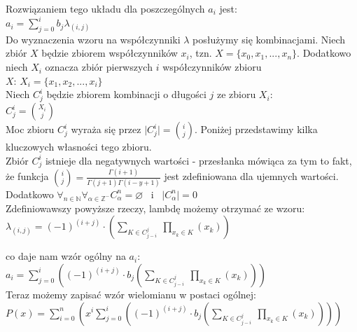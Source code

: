 \documentclass[a4paper,12pt]{article}
\newcommand{\id}{\noindent}
\newcommand{\el}[2]{\lambda_{(#1, #2)}}
\newcommand{\fa}[1]{\displaystyle\mathop{\forall}_{#1}}
\begin{document}
\id
Rozwiązaniem tego układu dla poszczególnych $a_i$ jest: \\

$a_i = \sum\limits_{j=0}^{i}b_j\el{i}{j}$ \\

\id
Do wyznaczenia wzoru na współczynniki $\lambda$ posłużymy się kombinacjami. Niech zbiór $X$ będzie zbiorem współczynników $x_i$, tzn. $X = \{ x_0, x_1, ... , x_n\}$. Dodatkowo niech $X_i$ oznacza zbiór pierwszych $i$ współczynników zbioru \\ $X$: $X_i = \{x_1, x_2, ..., x_i \}$ \\

\id
Niech $C_j^i$ będzie zbiorem kombinacji o długości $j$ ze zbioru $X_i$: \\

$C_j^i = \binom{X_i}{j}$ \\

\id
Moc zbioru $C_j^i$ wyraża się przez $\vert C_j^i\vert = \binom{i}{j}$. Poniżej przedstawimy kilka kluczowych własności tego zbioru. \\

\id
Zbiór $C_j^i$ istnieje dla negatywnych wartości - przesłanka mówiąca za tym to fakt, że funkcja $\binom{i}{j} = \frac{\Gamma (i+1)}{\Gamma (j+1) \Gamma (i-y+1 )}$ jest zdefiniowana dla ujemnych wartości. \\

\id
Dodatkowo $\fa{ n\in \mathbb{N}}\fa{\alpha \in \mathbb{Z}^{-}}C^n_\alpha = \varnothing$ \ i \ $\vert C_\alpha^n\vert = 0$ \\

\id
Zdefiniowawszy powyższe rzeczy, lambdę możemy otrzymać ze wzoru: \\

$\el{i}{j} = (-1)^{(i+j)}\cdot \left( \sum\limits_{K \in C^j_{j-i}} \ \prod\limits_{x_k \in K} \left( x_k \right) \right)$ \\

\newpage

\id
co daje nam wzór ogólny na $a_i$: \\

$a_i = \sum\limits_{j=0}^{i} \left( (-1)^{(i+j)}\cdot b_j\left( \sum\limits_{K \in C^j_{j-i}} \ \prod\limits_{x_k \in K} \left( x_k \right) \right) \right)$ \\

\id
Teraz możemy zapisać wzór wielomianu w postaci ogólnej: \\

$P(x) = \sum\limits_{i=0}^{n} \left( x^i\sum\limits_{j=0}^{i} \left( (-1)^{(i+j)}\cdot b_j\left( \sum\limits_{K \in C^j_{j-i}} \ \prod\limits_{x_k \in K} \left( x_k \right) \right) \right) \right)$ \\
\end{document}
